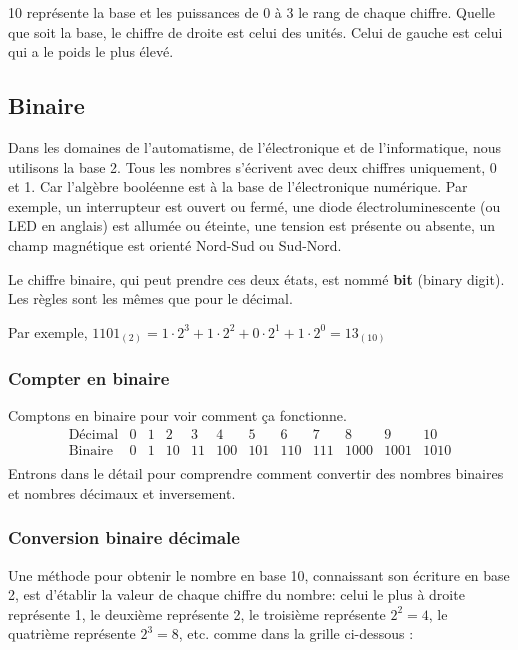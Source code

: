\documentclass[11pt, a4paper]{book}
\begin{document}
10 représente la base et les puissances de 0 à 3 le rang de chaque chiffre. Quelle que soit la base, le chiffre de droite est celui des unités. Celui de gauche est celui qui a le poids le plus élevé.

\subsection{Binaire}

Dans les domaines de l'automatisme, de l'électronique et de l'informatique, nous utilisons la base 2. Tous les nombres s'écrivent avec deux chiffres uniquement, 0 et 1.  Car l'algèbre booléenne est à la base de l'électronique numérique. Par exemple, un interrupteur est ouvert ou fermé, une diode électroluminescente (ou LED en anglais) est allumée ou éteinte,  une tension est présente ou absente, un champ magnétique est orienté Nord-Sud ou Sud-Nord.

Le chiffre binaire, qui peut prendre ces deux états, est nommé {\bf bit} (binary digit). Les règles sont les mêmes que pour le décimal. 

Par exemple, $1101_{(2)}=1 \cdot 2^3 + 1 \cdot 2^2 + 0 \cdot 2^1 + 1\cdot 2^0=13_{(10)}$ 

\subsubsection{Compter en binaire}
Comptons en binaire pour voir comment ça fonctionne.
\[
\begin{array}{cccccccccccc}
\text{Décimal} & 0 & 1 & 2 & 3 & 4 & 5 & 6 & 7 & 8 & 9 & 10 \\
\text{Binaire} & 0 & 1 & 10 & 11 & 100 & 101 & 110 & 111 & 1000 & 1001 & 1010 \\
\end{array}
\]
Entrons dans le détail pour comprendre comment convertir des nombres binaires et nombres décimaux et inversement.
\subsubsection{Conversion binaire décimale}

Une méthode pour obtenir le nombre en base 10, connaissant son écriture en base 2, est d'établir la valeur de chaque chiffre du nombre: celui le plus à droite représente 1, le deuxième représente 2, le troisième représente $2^2=4$, le quatrième représente $2^3=8$, etc. comme dans la grille ci-dessous :  

\begin{center}
\end{center} 
\end{document}
